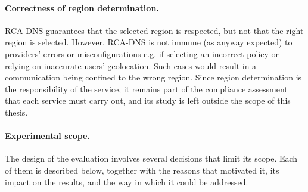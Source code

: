 \documentclass[
A4paper,                %
twoside,                %
openright,              %
chapterprefix=true,     %
12pt,                   %
headings=normal,        %
titlepage=on            %
]{book}
\begin{document}
\paragraph{Correctness of region determination.} RCA-DNS guarantees that the selected region is respected, but not that the right region is selected. However, RCA-DNS is not immune (as anyway expected) to providers' errors or misconfigurations e.g. if selecting an incorrect policy or relying on inaccurate users' geolocation. Such cases would result in a communication being confined to the wrong region. Since region determination is the responsibility of the service, it remains part of the compliance assessment that each service must carry out, and its study is left outside the scope of this thesis.

\paragraph{Experimental scope.} The design of the evaluation involves several decisions that limit its scope. Each of them is described below, together with the reasons that motivated it, its impact on the results, and the way in which it could be addressed.
\end{document}
